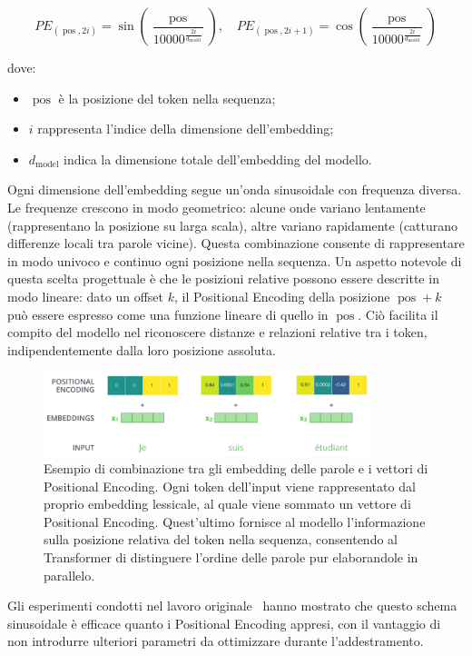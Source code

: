 \begin{equation}
PE_{(\operatorname{pos},2i)} = \sin\left(\frac{\operatorname{pos}}{10000^{\frac{2i}{d_{\operatorname{model}}}}}\right), \quad
PE_{(\operatorname{pos},2i+1)} = \cos\left(\frac{\operatorname{pos}}{10000^{\frac{2i}{d_{\operatorname{model}}}}}\right)
\end{equation}

dove:
\begin{itemize}
    \item $\operatorname{pos}$ è la posizione del token nella sequenza;
    \item $i$ rappresenta l’indice della dimensione dell’embedding;
    \item $d_{\operatorname{model}}$ indica la dimensione totale dell’embedding del modello.
\end{itemize}

Ogni dimensione dell’embedding segue un’onda sinusoidale con frequenza diversa. Le frequenze crescono in modo geometrico: alcune onde variano lentamente (rappresentano la posizione su larga scala), altre variano rapidamente (catturano differenze locali tra parole vicine). Questa combinazione consente di rappresentare in modo univoco e continuo ogni posizione nella sequenza. Un aspetto notevole di questa scelta progettuale è che le posizioni relative possono essere descritte in modo lineare: dato un offset $k$, il Positional Encoding della posizione $\operatorname{pos} + k$ può essere espresso come una funzione lineare di quello in $\operatorname{pos}$. Ciò facilita il compito del modello nel riconoscere distanze e relazioni relative tra i token, indipendentemente dalla loro posizione assoluta.
\begin{figure}[hbtp]
    \centering
    \includegraphics[width=0.85\textwidth]{figure/PositionalEncoding}
    \caption{Esempio di combinazione tra gli embedding delle parole e i vettori di Positional Encoding. Ogni token dell’input viene rappresentato dal proprio embedding lessicale, al quale viene sommato un vettore di Positional Encoding. Quest’ultimo fornisce al modello l’informazione sulla posizione relativa del token nella sequenza, consentendo al Transformer di distinguere l’ordine delle parole pur elaborandole in parallelo.}
    \label{fig:posEncoding}
\end{figure}
Gli esperimenti condotti nel lavoro originale~\cite{vaswani2017attention} hanno mostrato che questo schema sinusoidale è efficace quanto i Positional Encoding appresi, con il vantaggio di non introdurre ulteriori parametri da ottimizzare durante l’addestramento.

